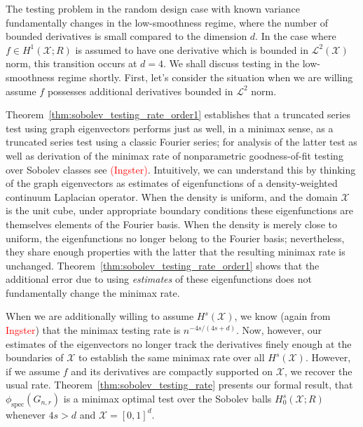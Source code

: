 \documentclass{article}
\newcommand{\1}{\mathbf{1}}
\newcommand{\Xset}{\mathcal{X}}
\newcommand{\Leb}{\mathcal{L}}
\theoremstyle{alden}
\theoremstyle{aldenthm}
\theoremstyle{definition}
\theoremstyle{remark}
\begin{document}
The testing problem in the random design case with known variance fundamentally changes in the low-smoothness regime, where the number of bounded derivatives is small compared to the dimension $d$. In the case where $f \in H^1(\Xset;R)$ is assumed to have one derivative which is bounded in $\Leb^2(\Xset)$ norm, this transition occurs at $d = 4$. We shall discuss testing in the low-smoothness regime shortly. First, let's consider the situation when we are willing assume $f$ possesses additional derivatives bounded in $\Leb^2$ norm.

Theorem~\ref{thm:sobolev_testing_rate_order1} establishes that a truncated series test using graph eigenvectors performs just as well, in a minimax sense, as a truncated series test using a classic Fourier series; for analysis of the latter test as well as derivation of the minimax rate of nonparametric goodness-of-fit testing over Sobolev classes see \textcolor{red}{(Ingster)}. Intuitively, we can understand this by thinking of the graph eigenvectors as estimates of eigenfunctions of a density-weighted continuum Laplacian operator. When the density is uniform, and the domain $\Xset$ is the unit cube, under appropriate boundary conditions these eigenfunctions are themselves elements of the Fourier basis. When the density is merely close to uniform, the eigenfunctions no longer belong to the Fourier basis; nevertheless, they share enough properties with the latter that the resulting minimax rate is unchanged. Theorem~\ref{thm:sobolev_testing_rate_order1} shows that the additional error due to using \textit{estimates} of these eigenfunctions does not fundamentally change the minimax rate. 

When we are additionally willing to assume $H^s(\Xset)$, we know (again from \textcolor{red}{Ingster}) that the minimax testing rate is $n^{-4s/(4s + d)}$. Now, however, our estimates of the eigenvectors no longer track the derivatives finely enough at the boundaries of $\Xset$ to establish the same minimax rate over all $H^s(\mathcal{X})$. However, if we assume $f$ and its derivatives are compactly supported on $\Xset$, we recover the usual rate. Theorem~\ref{thm:sobolev_testing_rate} presents our formal result, that $\phi_{\textrm{spec}}(G_{n,r})$ is a minimax optimal test over the Sobolev balls $H_0^s(\mathcal{X};R)$ whenever $4s > d$ and $\Xset = [0,1]^d$.
\end{document}
